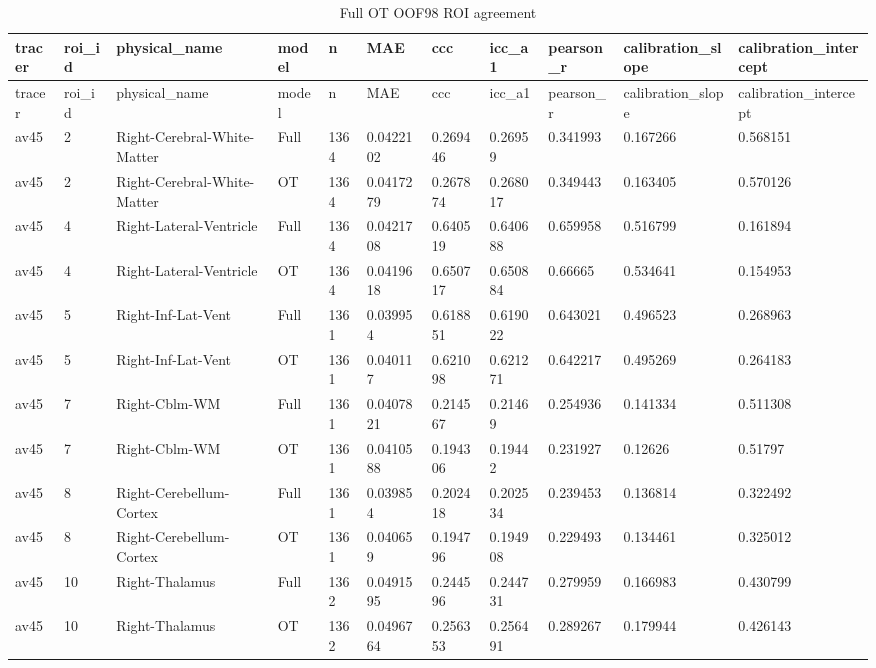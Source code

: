 \begin{landscape}
\begingroup
\footnotesize
\setlength{\tabcolsep}{4pt}
\begin{longtable}{lllllllllll}
\caption{Full OT OOF98 ROI agreement}\label{tab:s-n11}\\
\toprule
tracer & roi\_id & physical\_name & model & n & MAE & ccc & icc\_a1 & pearson\_r & calibration\_slope & calibration\_intercept \\
\midrule
\endfirsthead
\toprule
tracer & roi\_id & physical\_name & model & n & MAE & ccc & icc\_a1 & pearson\_r & calibration\_slope & calibration\_intercept \\
\midrule
\endhead
\bottomrule
\endfoot
av45 & 2 & Right-Cerebral-White-Matter & Full & 1364 & 0.0422102 & 0.269446 & 0.26959 & 0.341993 & 0.167266 & 0.568151 \\
av45 & 2 & Right-Cerebral-White-Matter & OT & 1364 & 0.0417279 & 0.267874 & 0.268017 & 0.349443 & 0.163405 & 0.570126 \\
av45 & 4 & Right-Lateral-Ventricle & Full & 1364 & 0.0421708 & 0.640519 & 0.640688 & 0.659958 & 0.516799 & 0.161894 \\
av45 & 4 & Right-Lateral-Ventricle & OT & 1364 & 0.0419618 & 0.650717 & 0.650884 & 0.66665 & 0.534641 & 0.154953 \\
av45 & 5 & Right-Inf-Lat-Vent & Full & 1361 & 0.039954 & 0.618851 & 0.619022 & 0.643021 & 0.496523 & 0.268963 \\
av45 & 5 & Right-Inf-Lat-Vent & OT & 1361 & 0.040117 & 0.621098 & 0.621271 & 0.642217 & 0.495269 & 0.264183 \\
av45 & 7 & Right-Cblm-WM & Full & 1361 & 0.0407821 & 0.214567 & 0.21469 & 0.254936 & 0.141334 & 0.511308 \\
av45 & 7 & Right-Cblm-WM & OT & 1361 & 0.0410588 & 0.194306 & 0.19442 & 0.231927 & 0.12626 & 0.51797 \\
av45 & 8 & Right-Cerebellum-Cortex & Full & 1361 & 0.039854 & 0.202418 & 0.202534 & 0.239453 & 0.136814 & 0.322492 \\
av45 & 8 & Right-Cerebellum-Cortex & OT & 1361 & 0.040659 & 0.194796 & 0.194908 & 0.229493 & 0.134461 & 0.325012 \\
av45 & 10 & Right-Thalamus & Full & 1362 & 0.0491595 & 0.244596 & 0.244731 & 0.279959 & 0.166983 & 0.430799 \\
av45 & 10 & Right-Thalamus & OT & 1362 & 0.0496764 & 0.256353 & 0.256491 & 0.289267 & 0.179944 & 0.426143 \\

\end{longtable}
\end{landscape}
